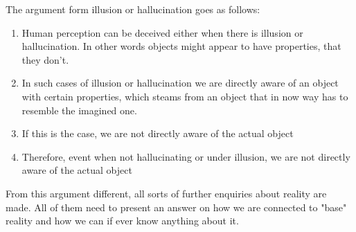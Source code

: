 \documentclass[fleqn,14pt]{article}
\begin{document}

The argument form illusion or hallucination goes as follows\cite[p.295]{sosa}:

\begin{enumerate}
  \item Human perception can be deceived either when there is illusion or
  hallucination. In other words objects might appear to have properties, that
  they don't.
  \item In such cases of illusion or hallucination we are directly aware of an
  object with certain properties, which steams from an object that in now way
  has to resemble the imagined one.
  \item If this is the case, we are not directly aware of the actual object 
  \item Therefore, event when not hallucinating or under illusion, we are not directly aware
  of the actual object
\end{enumerate}
From this argument different, all sorts of further enquiries about reality are made. All of them need to
present an answer on how we are connected to "base" reality and how we can if ever know anything about it.\\
\\
\end{document}
